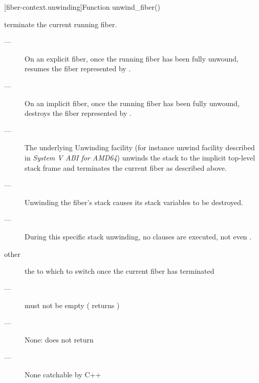 [fiber-context.unwinding]{Function unwind\_fiber()}


\effects
terminate the current running fiber.

\remarks
\begin{description}
    \item[---] On an explicit fiber, once the running fiber has
               been fully unwound, \unwindfib resumes the fiber represented
               by . 
    \item[---] On an implicit fiber, once the running fiber has been fully
               unwound, \unwindfib destroys the fiber represented
               by .
    \item[---] The underlying Unwinding facility (for instance unwind facility
               described in \emph{System V ABI for AMD64}) unwinds the stack
               to the implicit top-level stack frame and terminates the
               current fiber as described above.
    \item[---] Unwinding the fiber's stack causes its stack variables to be
               destroyed.
    \item[---] During this specific stack unwinding, 
               no  clauses are executed, not even \catchall.
\end{description}

\params
\begin{description}
    \item[other] the \fiber to which to switch once the current fiber has terminated
\end{description}

\requires
\begin{description}
    \item[---]  must not be empty ( returns )
\end{description}

\returns
\begin{description}
    \item[---] None: \unwindfib does not return
\end{description}

\except
\begin{description}
    \item[---] None catchable by C++
\end{description}
